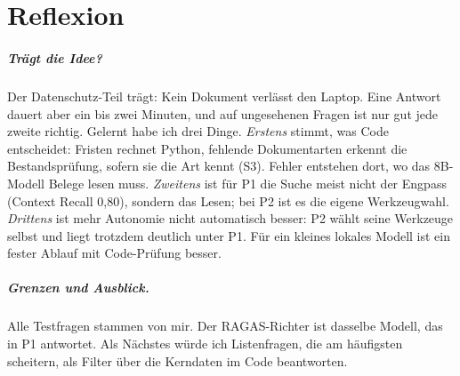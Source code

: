 
\chapter{Reflexion}
\label{chap:reflexion}

\paragraph{Trägt die Idee?} Der Datenschutz-Teil trägt: Kein Dokument verlässt den Laptop. Eine Antwort dauert aber ein bis zwei Minuten, und auf ungesehenen Fragen ist nur gut jede zweite richtig. Gelernt habe ich drei Dinge. \emph{Erstens} stimmt, was Code entscheidet: Fristen rechnet Python, fehlende Dokumentarten erkennt die Bestandsprüfung, sofern sie die Art kennt (S3). Fehler entstehen dort, wo das 8B-Modell Belege lesen muss. \emph{Zweitens} ist für P1 die Suche meist nicht der Engpass (Context Recall 0,80), sondern das Lesen; bei P2 ist es die eigene Werkzeugwahl. \emph{Drittens} ist mehr Autonomie nicht automatisch besser: P2 wählt seine Werkzeuge selbst und liegt trotzdem deutlich unter P1. Für ein kleines lokales Modell ist ein fester Ablauf mit Code-Prüfung besser.

\paragraph{Grenzen und Ausblick.} Alle Testfragen stammen von mir. Der RAGAS-Richter ist dasselbe Modell, das in P1 antwortet. Als Nächstes würde ich Listenfragen, die am häufigsten scheitern, als Filter über die Kerndaten im Code beantworten.
